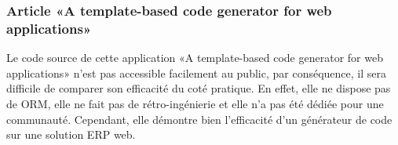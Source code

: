 





\subsubsection{Article «A template-based code generator for web applications»}
Le code source de cette application «A template-based code generator for web applications» n’est pas accessible facilement au public, par conséquence, il sera difficile de comparer son efficacité du coté pratique. En effet, elle ne dispose pas de ORM, elle ne fait pas de rétro-ingénierie et elle n'a pas été dédiée pour une communauté. Cependant, elle démontre bien l'efficacité d'un générateur de code sur une solution ERP web.
